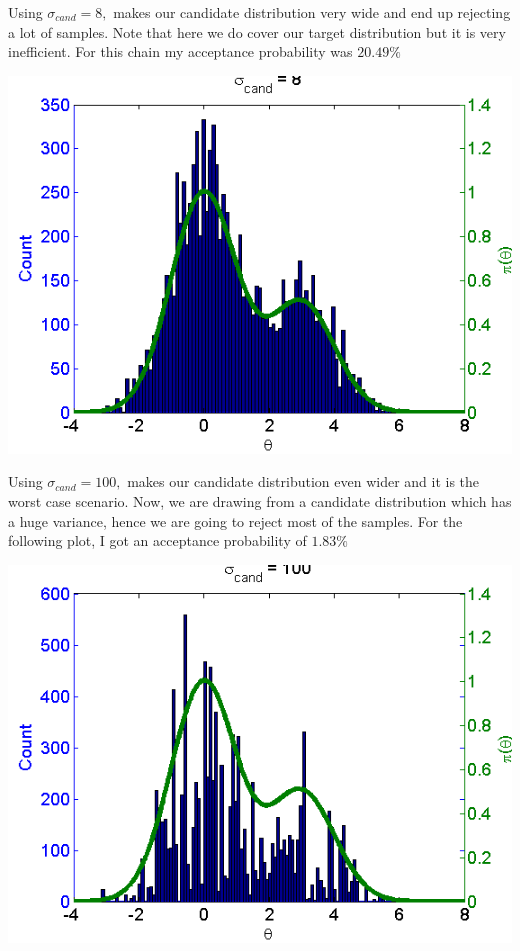 \documentclass{article}
\begin{document}
\pagebreak

Using $\sigma_{cand} = 8,$ makes our candidate distribution very wide and end up rejecting a lot of samples. Note that here we do cover our target distribution but it is very inefficient. For this chain my acceptance probability was $20.49\%$\\
\begin{center}
\includegraphics[scale=0.75]{AnalyticAndSampled8.png}\\
\end{center}

\pagebreak

Using $\sigma_{cand} = 100,$ makes our candidate distribution even wider and it is the worst case scenario. Now, we are drawing from a candidate distribution which has a huge variance, hence we are going to reject most of the samples. For the following plot, I got an acceptance probability of $1.83\%$\\
\begin{center}
\includegraphics[scale=0.75]{AnalyticAndSampled100.png}\\
\end{center}


\pagebreak
{}\\

\end{document}
